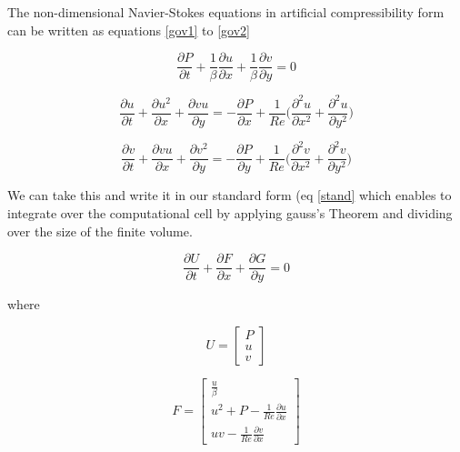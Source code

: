 \documentclass[paper=a4, fontsize=11pt, abstract=on]{scrartcl}
\numberwithin{equation}{section}		%
\numberwithin{figure}{section}			%
\numberwithin{table}{section}				%
\begin{document}
The non-dimensional Navier-Stokes equations in
artificial compressibility form can be written as equations \ref{gov1} to \ref{gov2}

\begin{equation}
\label{gov1}
\frac{\partial P}{\partial t}+\frac{1}{\beta}\frac{\partial u}{\partial x}+\frac{1}{\beta}\frac{\partial v}{\partial y} = 0
\end{equation} 

 \begin{equation}
\label{nav}
\frac{\partial u}{\partial t} +\frac{\partial u^2}{\partial x}+\frac{\partial vu}{\partial y} = -\frac{\partial P}{\partial x} + \frac{1}{Re} \Bigg(  \frac{\partial^2 u}{\partial x^2} + \frac{\partial^2 u}{\partial y^2} \Bigg)
\end{equation} 

 \begin{equation}
\label{gov2}
\frac{\partial v}{\partial t} +\frac{\partial vu}{\partial x}+\frac{\partial v^2}{\partial y} = -\frac{\partial P}{\partial y} + \frac{1}{Re} \Bigg(  \frac{\partial^2 v}{\partial x^2} + \frac{\partial^2 v}{\partial y^2} \Bigg)
\end{equation} 

We can take this and write it in our standard form (eq \ref{stand} which enables to integrate over the computational cell by applying gauss's Theorem and dividing over the size of the finite volume.

 \begin{equation}
\label{stand}
\frac{\partial U}{\partial t} + \frac{\partial F}{\partial x} + \frac{\partial G}{\partial y} = 0
\end{equation} 

where

\begin{equation}
\label{nav}
U= \begin{bmatrix}
   P    \\
   u  \\
    v
\end{bmatrix}
\end{equation} 

\begin{equation}
\label{nav}
F= \begin{bmatrix}
    \frac{u}{\beta}    \\
   u^2+P-\frac{1}{Re}\frac{\partial u}{\partial x}  \\
    uv-\frac{1}{Re}\frac{\partial v}{\partial x}
\end{bmatrix}
\end{equation} 
\end{document}
